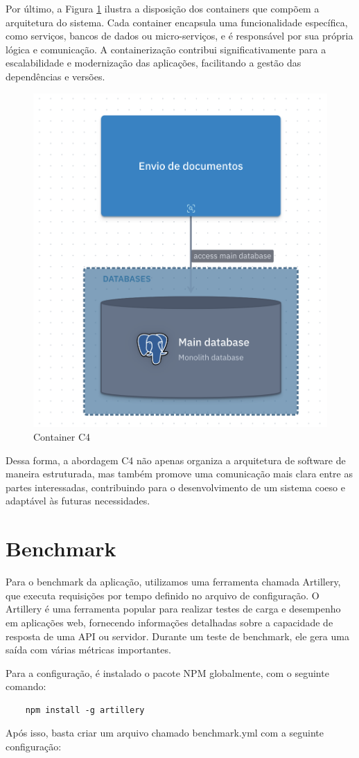 Por último, a Figura \ref{fig:container-c4} ilustra a disposição dos containers que compõem a arquitetura do sistema. Cada container encapsula uma funcionalidade específica, como serviços, bancos de dados ou micro-serviços, e é responsável por sua própria lógica e comunicação. A containerização contribui significativamente para a escalabilidade e modernização das aplicações, facilitando a gestão das dependências e versões.

\begin{figure}
    \centering
    \includegraphics[width=0.3\linewidth]{assets/container-c4}
    \caption{Container C4}
    \sourcemedaddy
    \label{fig:container-c4}
\end{figure}

Dessa forma, a abordagem C4 não apenas organiza a arquitetura de software de maneira estruturada, mas também promove uma comunicação mais clara entre as partes interessadas, contribuindo para o desenvolvimento de um sistema coeso e adaptável às futuras necessidades.

\section{Benchmark}

Para o benchmark da aplicação, utilizamos uma ferramenta chamada Artillery, que executa requisições por tempo definido no arquivo de configuração.
O Artillery é uma ferramenta popular para realizar testes de carga e desempenho em aplicações web, fornecendo informações detalhadas sobre a capacidade de resposta de uma API ou servidor. Durante um teste de benchmark, ele gera uma saída com várias métricas importantes.

Para a configuração, é instalado o pacote NPM globalmente, com o seguinte comando:

\begin{verbatim}
    npm install -g artillery
\end{verbatim}

Após isso, basta criar um arquivo chamado benchmark.yml com a seguinte configuração:

